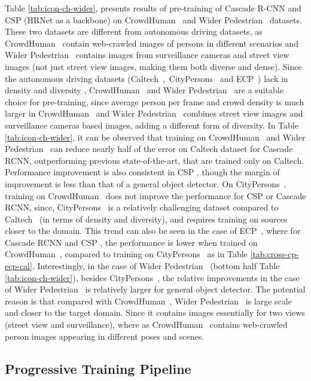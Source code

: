 \documentclass[final]{cvpr}
\newcommand{\caltech}[1]{{Caltech~\cite{dollar2012pedestrian}}}
\newcommand{\cityperson}[1]{{CityPersons~\cite{zhang2017citypersons}}}
\newcommand{\ecp}[1]{{ECP~\cite{braun2018eurocity}}}
\newcommand{\widerperson}[1]{{Wider Pedestrian~\cite{zhang2019widerperson}}}
\newcommand{\crowdhuman}[1]{{CrowdHuman~\cite{shao2018crowdhuman}}}
\newcommand{\caltecha}[1]{{Caltech}}
\begin{document}
Table \ref{tab:icon-ch-wider}, presents results of pre-training of Cascade R-CNN \cite{cai2019cascade} and CSP \cite{Liu2018DBC} (HRNet \cite{wang2019deep} as a backbone) on \crowdhuman{} and \widerperson{} datasets.  
These two datasets are different from autonomous driving datasets, as \crowdhuman{} contain web-crawled images of persons in different scenarios and \widerperson{} contains images from surveillance cameras and street view images (not just street view images, making them both diverse and dense).
Since the autonomous driving datasets (\caltech{},~\cityperson{} and \ecp{}) lack in density and diversity \cite{zhang2019widerperson}, \crowdhuman{} and \widerperson{} are a suitable choice for pre-training, since average person per frame and crowd density is much larger in \crowdhuman{} and \widerperson{} combines street view images and surveillance cameras based images, adding a different form of diversity. 
In Table \ref{tab:icon-ch-wider}, it can be observed that training on \crowdhuman{} and \widerperson{} can reduce nearly half of the error on \caltecha{}{} dataset for Cascade RCNN, outperforming previous state-of-the-art, that are trained only on \caltecha{}{}. Performance improvement is also consistent in CSP \cite{Liu2018DBC}, though the margin of improvement is less than that of a general object detector. On \cityperson{}, training on \crowdhuman{} does not improve the performance for CSP \cite{Liu2018DBC} or Cascade RCNN, since, \cityperson{} is a relatively challenging dataset compared to \caltech{} (in terms of density and diversity), and requires training on sources closer to the domain. This trend can also be seen in the case of \ecp{}, where for Cascade RCNN and CSP \cite{Liu2018DBC}, the performance is lower when trained on \crowdhuman{}, compared to training on \cityperson{} as in Table \ref{tab:cross-cp-ecp-cal}. Interestingly, in the case of \widerperson{} (bottom half Table \ref{tab:icon-ch-wider}), besides \cityperson{}, the relative improvements in the case of \widerperson{} is relatively larger for general object detector. The potential reason is that compared with \crowdhuman{}, \widerperson{} is large scale and closer to the target domain. Since it contains images essentially for two views (street view and surveillance), where as \crowdhuman{} contains web-crawled person images appearing in different poses and scenes.          



\subsection{Progressive Training Pipeline}
\end{document}
